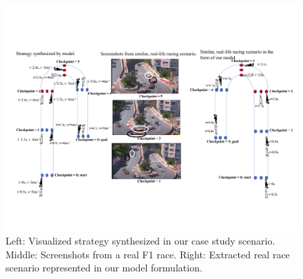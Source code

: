 \begin{figure}
\includegraphics[height=0.8\textwidth, width=\textheight]{Figures/HairpinViz.pdf}
    \caption[Synthesized strategy compared to real-life scenario on a hairpin turn.] {Left: Visualized strategy synthesized in our case study scenario. Middle: Screenshots from a real F1 race.  Right: Extracted real race scenario represented in our model formulation.}
    \label{fig:hp}
\end{figure}

